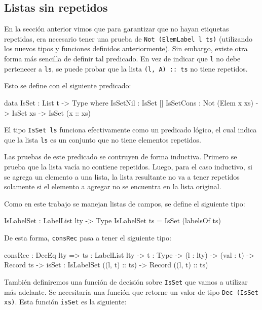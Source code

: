 \subsection{Listas sin repetidos}

En la sección anterior vimos que para garantizar que no hayan etiquetas repetidas, era necesario tener una prueba de \texttt{Not (ElemLabel l ts)} (utilizando los nuevos tipos y funciones definidos anteriormente). Sin embargo, existe otra forma más sencilla de definir tal predicado. En vez de indicar que \texttt{l} no debe pertenecer a \texttt{ls}, se puede probar que la lista \texttt{(l, A) :: ts} no tiene repetidos.

Esto se define con el siguiente predicado:

\begin{code}
data IsSet : List t -> Type where
  IsSetNil : IsSet []
  IsSetCons : Not (Elem x xs) -> IsSet xs ->
    IsSet (x :: xs)
\end{code}

El tipo \texttt{IsSet ls} funciona efectivamente como un predicado lógico, el cual indica que la lista \texttt{ls} es un conjunto que no tiene elementos repetidos.

Las pruebas de este predicado se contruyen de forma inductiva. Primero se prueba que la lista vacía no contiene repetidos. Luego, para el caso inductivo, si se agrega un elemento a una lista, la lista resultante no va a tener repetidos solamente si el elemento a agregar no se encuentra en la lista original.

Como en este trabajo se manejan listas de campos, se define el siguiente tipo:

\begin{code}
IsLabelSet : LabelList lty -> Type
IsLabelSet ts = IsSet (labelsOf ts)
\end{code}

De esta forma, \texttt{consRec} pasa a tener el siguiente tipo:

\begin{code}
consRec : DecEq lty => {ts : LabelList lty} ->
  {t : Type} -> (l : lty) -> (val : t) ->
  Record ts -> {isSet : IsLabelSet ((l, t) :: ts)} ->
  Record ((l, t) :: ts)
\end{code}

También definiremos una función de decisión sobre \texttt{IsSet} que vamos a utilizar más adelante. Se necesitaría una función que retorne un valor de tipo \texttt{Dec (IsSet xs)}. Esta función \texttt{isSet}  es la siguiente:

